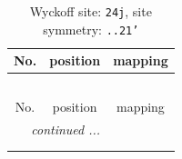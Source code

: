\documentclass[fleqn,8pt]{jsarticle}
\begin{document}
\renewcommand{\arraystretch}{1.2}
\begin{longtable}{ccc}
\caption{Wyckoff site: {\tt 24j}, site symmetry: {\tt ..21'}}
 \\
 \hline \hline
No. & position & mapping \\ \hline \endfirsthead

\multicolumn{2}{l}{\tablename\ \thetable{}} \\
 \hline \hline
No. & position & mapping \\ \hline \endhead

 \hline \hline
\multicolumn{2}{r}{\footnotesize\it continued ...} \\ \endfoot

 \hline \hline
\multicolumn{2}{r}{} \\ \endlastfoot


\end{longtable}
\end{document}
